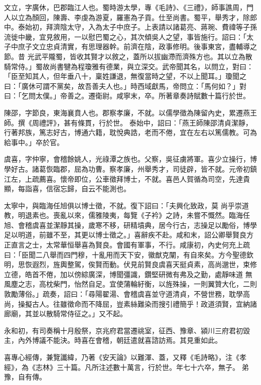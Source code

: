 \begin{pinyinscope}
 文立，字廣休，巴郡臨江人也。蜀時游太學，專《毛詩》、《三禮》，師事譙周，門人以立為顏回，陳壽、李虔為游夏，羅憲為子貢。仕至尚書。蜀平，舉秀才，除郎中。泰始初，拜濟陰太守，入為太子中庶子。上表請以諸葛亮、蔣琬、費禕等子孫流徙中畿，宜見敘用，一以慰巴蜀之心，其次傾吳人之望，事皆施行。詔曰：「太子中庶子文立忠貞清實，有思理器幹。前濟在陰，政事修明。後事東宮，盡輔導之節。昔
 光武平隴蜀，皆收其賢才以敘之，蓋所以拔幽滯而濟殊方也。其以立為散騎常侍。」蜀故尚書犍為程瓊雅有德業，與立深交。武帝聞其名，以問立，對曰：「臣至知其人，但年垂八十，稟姓謙退，無復當時之望，不以上聞耳。」瓊聞之曰：「廣休可謂不黨矣，故吾善夫人也。」時西域獻馬，帝問立：「馬何如？」對曰：「乞問太僕。」帝善之。遷衛尉。咸寧末，卒。所著章奏詩賦數十篇行於世。



 陳邵，字節良，東海襄賁人也。郡察孝廉，不就。以儒學徵為陳留內史，累遷燕王師。撰《周禮評》，甚有條貫，行於世。
 泰始中，詔曰：「燕王師陳邵清貞潔靜，行著邦族，篤志好古，博通六籍，耽悅典誥，老而不倦，宜在左右以篤儒教。可為給事中。」卒於官。



 虞喜，字仲寧，會稽餘姚人，光祿潭之族也。父察，吳征虜將軍。喜少立操行，博學好古。諸葛恢臨郡，屈為功曹。察孝廉，州舉秀才，司徒辟，皆不就。元帝初鎮江左，上疏薦喜。懷帝即位，公車徵拜博士，不就。喜邑人賀循為司空，先達貴顯，每詣喜，信宿忘歸，自云不能測也。



 太寧中，與臨海任旭俱以博士徵，不就。復下詔曰：「夫興化致政，莫
 尚乎崇道教，明退素也。喪亂以來，儒雅陵夷，每覽《子衿》之詩，未嘗不慨然。臨海任旭、會稽虞喜並潔靜其操，歲寒不移，研精墳典，居今行古，志操足以勵俗，博學足以明道，前雖不至，其更以博士徵之。」喜辭疾不赴。咸和末，詔公卿舉賢良方正直言之士，太常華恒舉喜為賢良。會國有軍事，不行。咸康初，內史何充上疏曰：「臣聞二八舉而四門穆，十亂用而天下安，徽猷克闡，有自來矣。方今聖德欽明，思恢遐烈，旌輿整駕，俟賢而動。伏見前賢良虞喜天挺貞素，高尚邈世，束修立德，皓首不倦，加以傍綜廣深，博聞彊識，鑽堅研微有弗及之勤，處靜味道
 無風塵之志，高枕柴門，怡然自足。宜使蒲輪紆衡，以旌殊操，一則翼贊大化，二則敦勵薄俗。」疏奏，詔曰：「尋陽翟湯、會稽虞喜並守道清貞，不營世務，耽學高尚，操擬古人。往雖徵命而不降屈，豈素絲難染而搜引禮簡乎！政道須賢，宜納諸廊廟，其並以散騎常侍征之。」又不起。



 永和初，有司奏稱十月殷祭，京兆府君當遷祧室，征西、豫章、潁川三府君初毀主，內外博議不能決。時喜在會稽，朝廷遣就喜諮訪焉。其見重如此。



 喜專心經傳，兼覽讖緯，乃著《安天論》以難渾、蓋，又釋《毛詩略》，注《孝經》，為《志林》三十篇。凡所注述數十萬言，行於世。年七十六卒，無子。
 弟豫，自有傳。




\end{pinyinscope}

